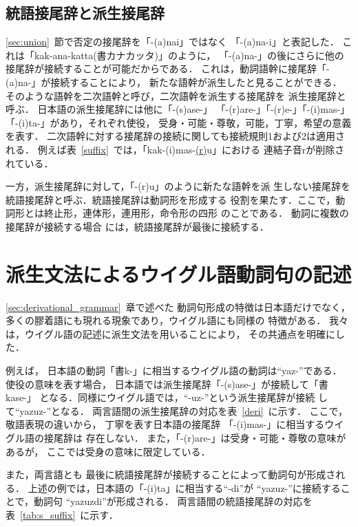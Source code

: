 \subsection{統語接尾辞と派生接尾辞}
\ref{sec:union}~節で否定の接尾辞を「-(a)nai」ではなく
「-(a)na-i」と表記した．
これは「kak-ana-katta(書カナカッタ)」のように，
「-(a)na-」の後にさらに他の接尾辞が接続することが可能だからである．
これは，動詞語幹に接尾辞「-(a)na-」が接続することにより，
新たな語幹が派生したと見ることができる．
そのような語幹を{\dg 二次語幹}と呼び，二次語幹を派生する接尾辞を
{\dg 派生接尾辞}と呼ぶ．
日本語の派生接尾辞には他に「-(s)ase-」
「-(r)are-」「-(r)e-」「-(i)mas-」「-(i)ta-」があり，それぞれ使役，
受身・可能・尊敬，可能，丁寧，希望の意義を表す．
二次語幹に対する接尾辞の接続に関しても接続規則1および2は適用される．
例えば表~\ref{suffix}~では，「kak-(i)mas-\underline{(r)}u」における
連結子音rが削除されている．

一方，派生接尾辞に対して，「-(r)u」のように新たな語幹を派
生しない接尾辞を{\dg 統語接尾辞}と呼ぶ．統語接尾辞は動詞形を形成する
役割を果たす．ここで，動詞形とは終止形，連体形，連用形，命令形の四形
のことである．
動詞に複数の接尾辞が接続する場合
には，統語接尾辞が最後に接続する．

\section{派生文法によるウイグル語動詞句の記述}
\ref{sec:derivational_grammar}~章で述べた
動詞句形成の特徴は日本語だけでなく，
多くの膠着語にも現れる現象であり，ウイグル語にも同様の
特徴がある．
我々は，ウイグル語の記述に派生文法を用いることにより，
その共通点を明確にした．

例えば，
日本語の動詞「書k-」に相当するウイグル語の動詞は``yaz-''である．
使役の意味を表す場合，
日本語では派生接尾辞「-(s)ase-」が接続して「書kase-」
となる．同様にウイグル語では，``-\mg uz-''という派生接尾辞が接続
して``yaz\mg uz-''となる．
両言語間の派生接尾辞の対応を表~\ref{deri}~に示す．
ここで，敬語表現の違いから，
丁寧を表す日本語の接尾辞
「-(i)mas-」に相当するウイグル語の接尾辞は
存在しない．
また，「-(r)are-」は受身・可能・尊敬の意味があるが，
ここでは受身の意味に限定している．

また，両言語とも
最後に統語接尾辞が接続することによって動詞句が形成される．
上述の例では，日本語の「-(i)ta」に相当する``-di''が
``yaz\mg uz-''に接続することで，動詞句
``yaz\mg uzdi''が形成される．
両言語間の統語接尾辞の対応を表~\ref{tab:s_suffix}~に示す．


